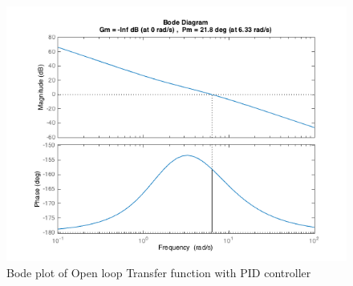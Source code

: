 \documentclass[english]{article}
\begin{document}
\begin{figure}[h!]
\caption{ Bode plot of  Open loop Transfer function with PID controller}
\label{fig:3_d}
\includegraphics[width=\linewidth]{3d2.png}
\end{figure} 
\FloatBarrier
\end{document}
